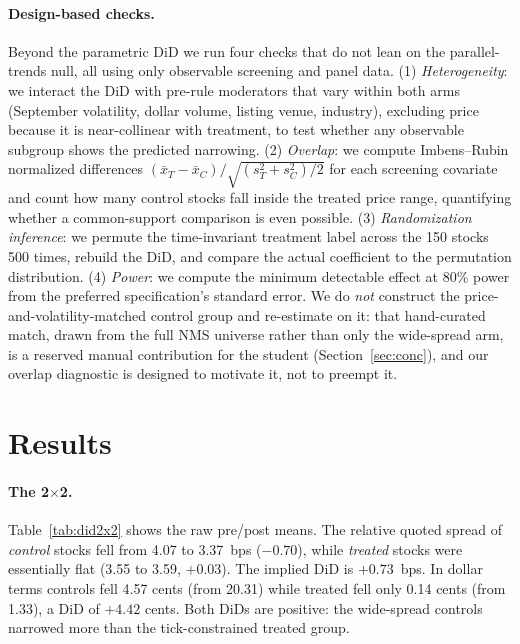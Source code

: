 \documentclass[12pt]{article}
\begin{document}
\paragraph{Design-based checks.} Beyond the parametric DiD we run four checks that do not lean
on the parallel-trends null, all using only observable screening and panel data. (1)
\emph{Heterogeneity}: we interact the DiD with pre-rule moderators that vary within both arms
(September volatility, dollar volume, listing venue, industry), excluding price because it is
near-collinear with treatment, to test whether any observable subgroup shows the predicted
narrowing. (2) \emph{Overlap}: we compute Imbens--Rubin normalized differences
$(\bar x_T-\bar x_C)/\sqrt{(s_T^2+s_C^2)/2}$ for each screening covariate and count how many
control stocks fall inside the treated price range, quantifying whether a common-support
comparison is even possible. (3) \emph{Randomization inference}: we permute the time-invariant
treatment label across the 150 stocks 500 times, rebuild the DiD, and compare the actual
coefficient to the permutation distribution. (4) \emph{Power}: we compute the minimum
detectable effect at 80\% power from the preferred specification's standard error. We do
\emph{not} construct the price-and-volatility-matched control group and re-estimate on it: that
hand-curated match, drawn from the full NMS universe rather than only the wide-spread arm, is a
reserved manual contribution for the student (Section~\ref{sec:conc}), and our overlap
diagnostic is designed to motivate it, not to preempt it.

\section{Results}\label{sec:res}
\paragraph{The 2$\times$2.} Table~\ref{tab:did2x2} shows the raw pre/post means. The
relative quoted spread of \emph{control} stocks fell from 4.07 to 3.37~bps ($-0.70$), while
\emph{treated} stocks were essentially flat (3.55 to 3.59, $+0.03$). The implied DiD is
$+0.73$~bps. In dollar terms controls fell 4.57 cents (from 20.31) while treated fell only
0.14 cents (from 1.33), a DiD of $+4.42$ cents. Both DiDs are positive: the wide-spread
controls narrowed more than the tick-constrained treated group.
\end{document}
